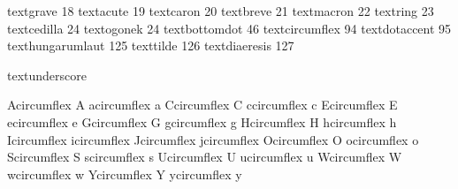 

\startencoding[default]

 textgrave         18 
 textacute         19
 textcaron         20 
 textbreve         21
 textmacron        22
 textring          23
 textcedilla       24 
 textogonek        24 %
 textbottomdot     46  
 textcircumflex    94 
 textdotaccent     95
 texthungarumlaut 125
 texttilde        126 
 textdiaeresis    127

 textunderscore {\fakeunderscore}

 Acircumflex {\buildtextaccent\textcircumflex A}
 acircumflex {\buildtextaccent\textcircumflex a}
 Ccircumflex {\buildtextaccent\textcircumflex C}
 ccircumflex {\buildtextaccent\textcircumflex c}
 Ecircumflex {\buildtextaccent\textcircumflex E}
 ecircumflex {\buildtextaccent\textcircumflex e}
 Gcircumflex {\buildtextaccent\textcircumflex G}
 gcircumflex {\buildtextaccent\textcircumflex g}
 Hcircumflex {\buildtextaccent\textcircumflex H}
 hcircumflex {\buildtextaccent\textcircumflex h}
 Icircumflex {\buildtextaccent\textcircumflex \dotlessI}
 icircumflex {\buildtextaccent\textcircumflex \dotlessi}
 Jcircumflex {\buildtextaccent\textcircumflex \dotlessJ}
 jcircumflex {\buildtextaccent\textcircumflex \dotlessj}
 Ocircumflex {\buildtextaccent\textcircumflex O}
 ocircumflex {\buildtextaccent\textcircumflex o}
 Scircumflex {\buildtextaccent\textcircumflex S}
 scircumflex {\buildtextaccent\textcircumflex s}
 Ucircumflex {\buildtextaccent\textcircumflex U}
 ucircumflex {\buildtextaccent\textcircumflex u}
 Wcircumflex {\buildtextaccent\textcircumflex W}
 wcircumflex {\buildtextaccent\textcircumflex w}
 Ycircumflex {\buildtextaccent\textcircumflex Y}
 ycircumflex {\buildtextaccent\textcircumflex y}

